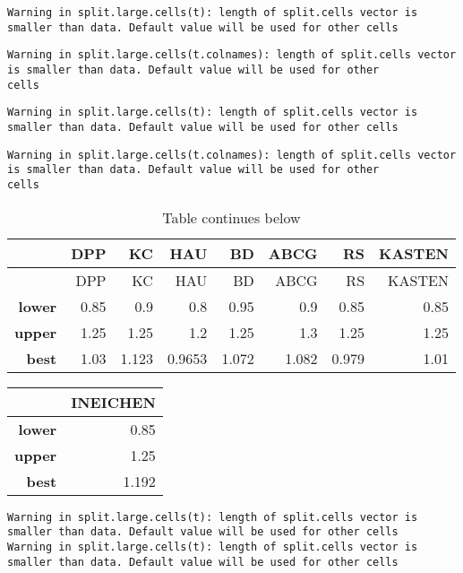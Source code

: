\documentclass[
  10pt,
  a4paper,oneside]{article}
\begin{document}
\begin{verbatim}
Warning in split.large.cells(t): length of split.cells vector is smaller than data. Default value will be used for other cells
\end{verbatim}

\begin{verbatim}
Warning in split.large.cells(t.colnames): length of split.cells vector is smaller than data. Default value will be used for other
cells
\end{verbatim}

\begin{verbatim}
Warning in split.large.cells(t): length of split.cells vector is smaller than data. Default value will be used for other cells
\end{verbatim}

\begin{verbatim}
Warning in split.large.cells(t.colnames): length of split.cells vector is smaller than data. Default value will be used for other
cells
\end{verbatim}

\begin{longtable}[]{@{}rrrrrrrr@{}}
\caption{Table continues below}\tabularnewline
\toprule\noalign{}
~ & DPP & KC & HAU & BD & ABCG & RS & KASTEN \\
\midrule\noalign{}
\endfirsthead
\toprule\noalign{}
~ & DPP & KC & HAU & BD & ABCG & RS & KASTEN \\
\midrule\noalign{}
\endhead
\bottomrule\noalign{}
\endlastfoot
\textbf{lower} & 0.85 & 0.9 & 0.8 & 0.95 & 0.9 & 0.85 & 0.85 \\
\textbf{upper} & 1.25 & 1.25 & 1.2 & 1.25 & 1.3 & 1.25 & 1.25 \\
\textbf{best} & 1.03 & 1.123 & 0.9653 & 1.072 & 1.082 & 0.979 & 1.01 \\
\end{longtable}

\begin{longtable}[]{@{}rr@{}}
\toprule\noalign{}
~ & INEICHEN \\
\midrule\noalign{}
\endhead
\bottomrule\noalign{}
\endlastfoot
\textbf{lower} & 0.85 \\
\textbf{upper} & 1.25 \\
\textbf{best} & 1.192 \\
\end{longtable}

\begin{verbatim}
Warning in split.large.cells(t): length of split.cells vector is smaller than data. Default value will be used for other cells
Warning in split.large.cells(t): length of split.cells vector is smaller than data. Default value will be used for other cells
\end{verbatim}
\end{document}
